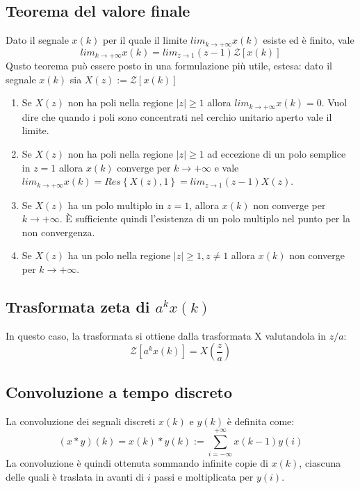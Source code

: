 \documentclass[11pt]{article}
\newcommand{\trz}{\mathcal{Z}}
\begin{document}
\subsection{Teorema del valore finale}
Dato il segnale $x(k)$ per il quale il limite $lim_{k\rightarrow+\infty}x(k)$ esiste ed è finito, vale
\begin{displaymath}
    lim_{k\rightarrow+\infty} x(k) = lim_{z\rightarrow1}(z-1)\trz[x(k)]
\end{displaymath}
Qusto teorema può essere posto in una formulazione più utile, estesa: dato il segnale $x(k)$ sia $X(z) := \trz[x(k)]$
\begin{enumerate}
    \item Se $X(z)$ non ha poli nella regione $|z|\ge1$ allora $lim_{k\rightarrow+\infty} x(k)=0$. Vuol dire che quando i poli sono concentrati nel cerchio unitario aperto vale il limite.
    \item Se $X(z)$ non ha poli nella regione $|z|\ge1$ ad eccezione di un polo semplice in $z=1$ allora $x(k)$ converge per $k\rightarrow+\infty$ e vale $lim_{k\rightarrow+\infty} x(k) = Res\left\{X(z),1\right\} = lim_{z\rightarrow1}(z-1)X(z)$.
    \item Se $X(z)$ ha un polo multiplo in $z=1$, allora $x(k)$ non converge per $k\rightarrow+\infty$. È sufficiente quindi l'esistenza di un polo multiplo nel punto per la non convergenza.
    \item Se $X(z)$ ha un polo nella regione $|z|\ge1, z\neq 1$ allora $x(k)$ non converge per $k\rightarrow+\infty$.
\end{enumerate}
\subsection{Trasformata zeta di $a^kx(k)$}
In questo caso, la trasformata si ottiene dalla trasformata X valutandola in $z/a$:
\begin{displaymath}
    \trz[a^k x(k)] = X\left(\frac{z}{a}\right)
\end{displaymath}
\subsection{Convoluzione a tempo discreto}
La convoluzione dei segnali discreti $x(k)$ e $y(k)$ è definita come:
\begin{displaymath}
    (x*y)(k)=x(k)*y(k) := \sum_{i=-\infty}^{+\infty} x(k-1)y(i)
\end{displaymath}
La convoluzione è quindi ottenuta sommando infinite copie di $x(k)$, ciascuna delle quali è traslata in avanti di $i$ passi e moltiplicata per $y(i)$.
\end{document}
